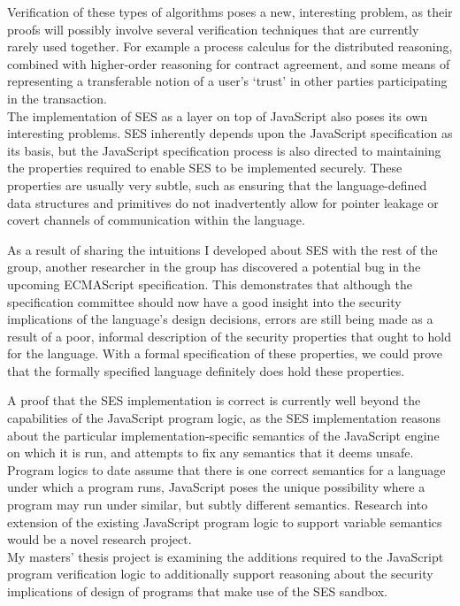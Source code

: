 \documentclass[a4paper]{article}
\begin{document}
Verification of these types of algorithms poses a new, interesting problem, as
their proofs will possibly involve several verification techniques that are
currently rarely used together. For example a process calculus for the
distributed reasoning, combined with higher-order reasoning for contract
agreement, and some means of representing a transferable notion of a user's
`trust' in other parties participating in the transaction.
\\

The implementation of SES as a layer on top of JavaScript also poses its own
interesting problems. SES inherently depends upon the JavaScript specification
as its basis, but the JavaScript specification process is also directed to
maintaining the properties required to enable SES to be implemented securely.
These properties are usually very subtle, such as ensuring that the
language-defined data structures and primitives do not inadvertently allow for
pointer leakage or covert channels of communication within the language.

As a result of sharing the intuitions I developed about SES with the rest of the
group, another researcher in the group has discovered a potential bug in the
upcoming ECMAScript specification. This demonstrates that although the
specification committee should now have a good insight into the security
implications of the language's design decisions, errors are still being made as
a result of a poor, informal description of the security properties that ought
to hold for the language. With a formal specification of these properties, we
could prove that the formally specified language definitely does hold these
properties.

A proof that the SES implementation is correct is currently well beyond the
capabilities of the JavaScript program logic, as the SES implementation reasons
about the particular implementation-specific semantics of the JavaScript engine
on which it is run, and attempts to fix any semantics that it deems unsafe.
Program logics to date assume that there is one correct semantics for a language
under which a program runs, JavaScript poses the unique possibility where a
program may run under similar, but subtly different semantics. Research into
extension of the existing JavaScript program logic to support variable semantics
would be a novel research project.
\\

My masters' thesis project is examining the additions required to the JavaScript
program verification logic to additionally support reasoning about the security
implications of design of programs that make use of the SES sandbox.
\end{document}
